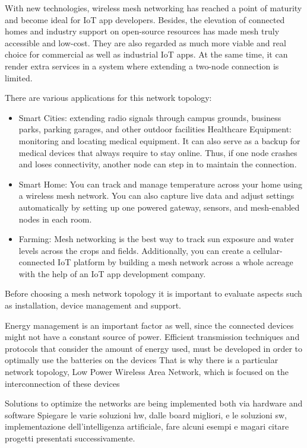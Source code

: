 		
		With new technologies, wireless mesh networking has reached a point of maturity and become ideal for IoT app developers. Besides, the elevation of connected homes and industry support on open-source resources has made mesh truly accessible and low-cost. They are also regarded as much more viable and real choice for commercial as well as industrial IoT apps. At the same time, it can render extra services in a system where extending a two-node connection is limited.
		
		There are various applications for this network topology:
		\begin{itemize}[noitemsep]
			\item Smart Cities: extending radio signals through campus grounds, business parks, parking garages, and other outdoor facilities
			Healthcare Equipment: monitoring and locating medical equipment. It can also serve as a backup for medical devices that always require to stay online. Thus, if one node crashes and loses connectivity, another node can step in to maintain the connection.
			\item Smart Home: You can track and manage temperature across your home using a wireless mesh network. You can also capture live data and adjust settings automatically by setting up one powered gateway, sensors, and mesh-enabled nodes in each room.
			\item Farming: Mesh networking is the best way to track sun exposure and water levels across the crops and fields. Additionally, you can create a cellular-connected IoT platform by building a mesh network across a whole acreage with the help of an IoT app development company.
		\end{itemize}

		Before choosing a mesh network topology it is important to evaluate aspects such as installation, device management and support.
		
		Energy management is an important factor as well, since the connected devices might not have a constant source of power.		
		Efficient transmission techniques and protocols that consider the amount of energy used, must be developed in order to optimally use the batteries on the devices		
		That is why there is a particular network topology, Low Power Wireless Area Network, which is focused on the interconnection of these devices
		
		Solutions to optimize the networks are being implemented both via hardware and software
		Spiegare le varie soluzioni hw, dalle board migliori, e le soluzioni sw, implementazione dell'intelligenza artificiale, fare alcuni esempi e magari citare progetti presentati successivamente.
	
